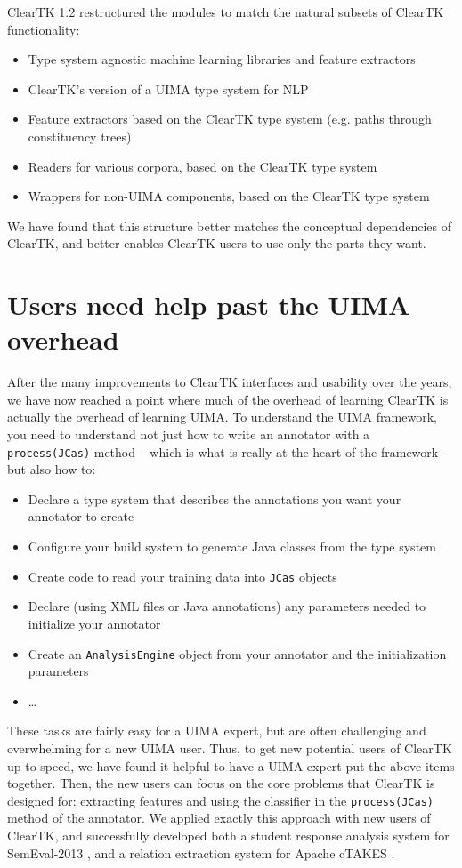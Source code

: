 \documentclass[10pt, a4paper]{article}
\newcommand{\code}[1]{\texttt{\small #1}}
\begin{document}
ClearTK 1.2 restructured the modules to match the natural subsets of ClearTK functionality:
\begin{itemize}
\item Type system agnostic machine learning libraries and feature extractors 
\item ClearTK's version of a UIMA type system for NLP
\item Feature extractors based on the ClearTK type system (e.g. paths through constituency trees)
\item Readers for various corpora, based on the ClearTK type system
\item Wrappers for non-UIMA components, based on the ClearTK type system
\end{itemize}
We have found that this structure better matches the conceptual dependencies of ClearTK, and better enables ClearTK users to use only the parts they want.


\section{Users need help past the UIMA overhead}
After the many improvements to ClearTK interfaces and usability over the years, we have now reached a point where much of the overhead of learning ClearTK is actually the overhead of learning UIMA.
To understand the UIMA framework, you need to understand not just how to write an annotator with a \code{process(JCas)} method -- which is what is really at the heart of the framework -- but also how to:
\begin{itemize}
\item Declare a type system that describes the annotations you want your annotator to create
\item Configure your build system to generate Java classes from the type system
\item Create code to read your training data into \code{JCas} objects
\item Declare (using XML files or Java annotations) any parameters needed to initialize your annotator
\item Create an \code{AnalysisEngine} object from your annotator and the initialization parameters
\item \ldots
\end{itemize}
These tasks are fairly easy for a UIMA expert, but are often challenging and overwhelming for a new UIMA user.
Thus, to get new potential users of ClearTK up to speed, we have found it helpful to have a UIMA expert put the above items together.
Then, the new users can focus on the core problems that ClearTK is designed for: extracting features and using the classifier in the \code{process(JCas)} method of the annotator.
We applied exactly this approach with new users of ClearTK, and successfully developed both a student response analysis system for SemEval-2013 \cite{okoye-bethard-sumner:2013:SemEval-2013}, and a relation extraction system for Apache cTAKES \cite{dligach2013discovering}.
\end{document}
